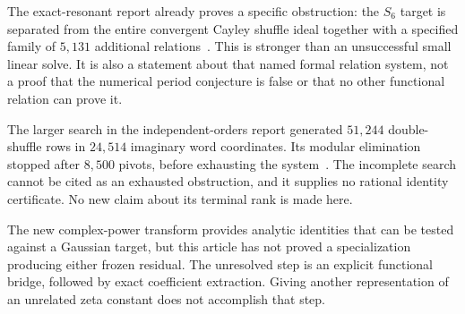 The exact-resonant report already proves a specific obstruction:
the $S_6$ target is separated from the entire convergent Cayley
shuffle ideal together with a specified family of $5{,}131$
additional relations~\cite{IncomingExact}. This is stronger than
an unsuccessful small linear solve. It is also a statement about
that named formal relation system, not a proof that the numerical
period conjecture is false or that no other functional relation
can prove it.

The larger search in the independent-orders report generated
$51{,}244$ double-shuffle rows in $24{,}514$ imaginary word
coordinates. Its modular elimination stopped after $8{,}500$
pivots, before exhausting the system~\cite{IncomingIndependent}.
The incomplete search cannot be cited as an exhausted obstruction,
and it supplies no rational identity certificate. No new claim
about its terminal rank is made here.

The new complex-power transform provides analytic identities that
can be tested against a Gaussian target, but this article has not
proved a specialization producing either frozen residual. The
unresolved step is an explicit functional bridge, followed by
exact coefficient extraction. Giving another representation of
an unrelated zeta constant does not accomplish that step.

